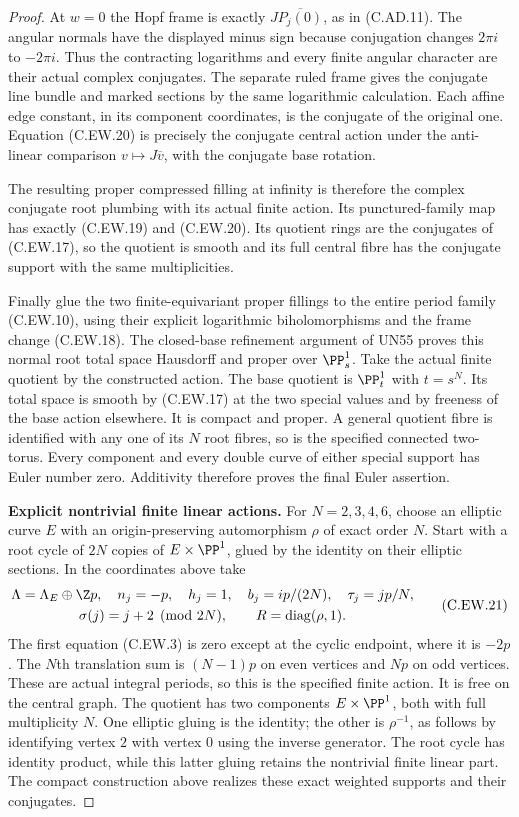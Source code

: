 \begin{proof}
At $w=0$ the Hopf frame is exactly
$J\overline{P_j(0)}$, as in (C.AD.11).
The angular normals have the displayed minus sign
because conjugation changes $2\pi i$ to $-2\pi i$.
Thus the contracting logarithms and every finite
angular character are their actual complex
conjugates. The separate ruled frame gives the
conjugate line bundle and marked sections by the
same logarithmic calculation. Each affine edge
constant, in its component coordinates, is the
conjugate of the original one. Equation (C.EW.20)
is precisely the conjugate central action under
the anti-linear comparison $v\mapsto J\overline v$,
with the conjugate base rotation.

The resulting proper compressed filling at infinity
is therefore the complex conjugate root plumbing
with its actual finite action. Its punctured-family
map has exactly (C.EW.19) and (C.EW.20).
Its quotient rings are the conjugates of
(C.EW.17), so the quotient is smooth and its full
central fibre has the conjugate support with the
same multiplicities.

Finally glue the two finite-equivariant proper
fillings to the entire period family (C.EW.10),
using their explicit logarithmic biholomorphisms
and the frame change (C.EW.18). The closed-base
refinement argument of UN55 proves this normal
root total space Hausdorff and proper over
$\PP^1_s$. Take the actual finite quotient by
the constructed action. The base quotient is
$\PP^1_t$ with $t=s^N$. Its total space is smooth
by (C.EW.17) at the two special values and by
freeness of the base action elsewhere. It is
compact and proper. A general quotient fibre is
identified with any one of its $N$ root fibres,
so is the specified connected two-torus.
Every component and every double curve of either
special support has Euler number zero. Additivity
therefore proves the final Euler assertion.

\par\medskip\noindent\textbf{Explicit nontrivial finite linear actions.}
For $N=2,3,4,6$, choose an elliptic curve $E$ with
an origin-preserving automorphism $\rho$ of exact
order $N$. Start with a root cycle of $2N$ copies
of $E\times\PP^1$, glued by the identity on their
elliptic sections. In the coordinates above take
\[
 \begin{gathered}
 \Lambda=\Lambda_E\oplus\Z p,\quad
 n_j=-p,\quad h_j=1,\quad
 b_j=ip/(2N),\quad \tau_j=j p/N,\\
 \sigma(j)=j+2\pmod{2N},\qquad
 R=\operatorname{diag}(\rho,1).
 \end{gathered}
\tag{C.EW.21}
\]
The first equation (C.EW.3) is zero except at the
cyclic endpoint, where it is $-2p$.
The $N$th translation sum is $(N-1)p$ on even
vertices and $Np$ on odd vertices. These are
actual integral periods, so this is the specified
finite action. It is free on the central graph.
The quotient has two components $E\times\PP^1$,
both with full multiplicity $N$. One elliptic
gluing is the identity; the other is $\rho^{-1}$,
as follows by identifying vertex $2$ with vertex
$0$ using the inverse generator. The root cycle
has identity product, while this latter gluing
retains the nontrivial finite linear part.
The compact construction above realizes these
exact weighted supports and their conjugates.


\end{proof}
